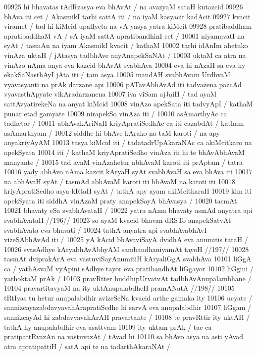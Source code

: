 09925 hi bhavatas tAdRzasya eva bhAvAt / na avazyaM sataH kutazcid  
09926 bhAva iti cet / AkasmikI tarhi sattA iti / na iyaM kasyacit kadAcit  
09927 kvacit viramet / tad hi kiMcid upalIyeta na vA yasya yatra kiMcit 
09928 pratibaddham apratibaddhaM vA / sA iyaM sattA apratibandhinI cet / 
10001 niyamavatI na syAt / tasmAn na iyam AkasmikI kvacit / kathaM  
10002 tarhi idAnIm ahetuko vinAza uktaH / jAtasya tadbhAve anyAnapekSaNAt /
10003 uktaM ca atra na vinAzo nAma anya eva kazcid bhAvAt svabhAva
10004 eva hi nAzaH sa eva hy ekakSaNasthAyI jAta iti / tam asya  
10005 mandAH svabhAvam UrdhvaM vyavasyanti na prAk darzane api  
10006 pATavAbhAvAd iti tadvazena pazcAd vyavasthApyate vikAradarzanena
10007 iva viSam ajJaiH / tad ayaM sattAvyatirekeNa na anyat kiMcid
10008 vinAzo apekSata iti tadvyApI / kathaM punar etad gamyate  
10009 nirapekSo vinAza iti /
10010 	asAmarthyAc ca tadhetor / 
10011 abhAvakAriNaH kriyApratiSedhAc ca iti cazabdAt / katham asAmarthyam /
10012 siddhe hi bhAve kArako na taM karoti / na apy anyakriyAyAM  
10013 tasya kiMcid iti / tadatadrUpAkaraNAc ca akiMcitkaro na apekSyata
10014 iti / kathaM kriyApratiSedho vinAza iti hi te bhAvAbhAvaM manyante /
10015 tad ayaM vinAzahetur abhAvaM karoti iti prAptam / tatra
10016 yady abhAvo nAma kazcit kAryaH syAt svabhAvaH sa eva bhAva iti
10017 na abhAvaH syAt / tasmAd abhAvaM karoti iti bhAvaM na karoti iti  
10018 kriyApratiSedho asya kRtaH syAt / tathA apy ayam akiMcitkaraH
10019 kim iti apekSyata iti siddhA vinAzaM praty anapekSayA bhAvasya /
10020 tasmAt 
10021 	bhavaty eSa svabhAvataH / 
10022 	yatra nAma bhavaty asmAd anyatra api svabhAvataH //196// 
10023 so ayaM kvacid bhavan dRSTo anapekSatvAt svabhAvata eva bhavati / 
10024 tathA anyatra api svabhAvabhAvI vizeSAbhAvAd iti /
10025 	yA kAcid bhAvaviSayA dvidhA eva anumitis tataH /
10026 	svasAdhye kAryabhAvAbhyAM sambandhaniyamAt tayoH //197// 
10028 tasmAt dviprakArA eva vastuviSayAnumitiH kAryaliGgA svabhAva
10101 liGgA ca / yathAsvaM vyApini sAdhye tayor eva pratibandhAt liGgayor  
10102 liGgini / yathoktaM prAk /  
10103 	pravRtter buddhipUrvatvAt tadbhAvAnupalambhane /  
10104 	pravartitavyaM na ity uktAnupalabdheH pramANatA //198// 
10105 tRtIyas tu hetur anupalabdhir avizeSeNa kvacid arthe gamaka ity 
10106 ucyate / sannizcayazabdavyavahArapratiSedhe hi sarvA eva anupalabdhir
10107 liGgam / sannizcayAd hi zabdavyavahArAH pravartante / 
10108 te pravRttir ity uktAH / tathA hy anupalabdhir eva asattvam 
10109 ity uktam prAk / tac ca pratipattRvazAn na vastuvazAt / tAvad hi 
10110 sa bhAvo asya na asti yAvad atra apratipattiH / satA api te na tadarthAkaraNAt /
